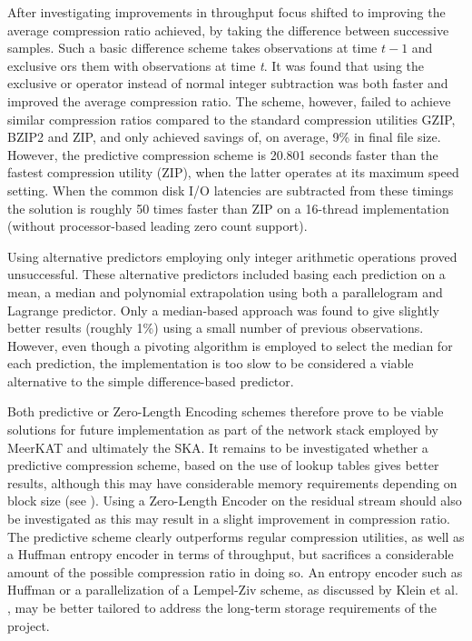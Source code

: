 After investigating improvements in throughput focus shifted to improving the average compression ratio achieved, by taking the difference between successive samples. Such a basic difference
scheme takes observations at time $t-1$ and exclusive ors them with observations at time \textit{t}. It was found that using the exclusive or operator instead of normal integer subtraction was both faster and improved the average
compression ratio. The scheme, however, failed to achieve similar compression ratios compared to the standard compression utilities GZIP, BZIP2 and ZIP, and only achieved savings of, on average, 9\% in final file size.
However, the predictive compression scheme is 20.801 seconds faster than the fastest compression utility (ZIP), when the latter operates at its maximum speed setting. When the common disk I/O latencies are subtracted from these 
timings the solution is roughly 50 times faster than ZIP on a 16-thread implementation (without processor-based leading zero count support).

Using alternative predictors employing only integer arithmetic operations proved unsuccessful. These alternative predictors included basing each prediction on a mean, a median and polynomial extrapolation using both a 
parallelogram and Lagrange predictor. Only a median-based approach was found to give slightly better results (roughly 1\%) using a small number of previous observations. However, even though a pivoting algorithm is employed to 
select the median for each prediction, the implementation is too slow to be considered a viable alternative to the simple difference-based predictor.

Both predictive or Zero-Length Encoding schemes therefore prove to be viable solutions for future implementation as part of the network stack employed by MeerKAT and ultimately the SKA. It remains to be investigated whether a predictive 
compression scheme, based on the use of lookup tables gives better results, although this may have considerable memory requirements depending on block size (see \cite{1607248,4589203,4976448}). Using a Zero-Length Encoder on the residual
stream should also be investigated as this may result in a slight improvement in compression ratio. The predictive scheme clearly outperforms regular compression utilities, as well as a Huffman entropy encoder in terms of throughput, 
but sacrifices a considerable amount of the possible compression ratio in doing so. An entropy encoder such as Huffman or a parallelization of a Lempel-Ziv scheme, as discussed by Klein et al. \cite{klein2005parallel}, may be better tailored 
to address the long-term storage requirements of the project.


